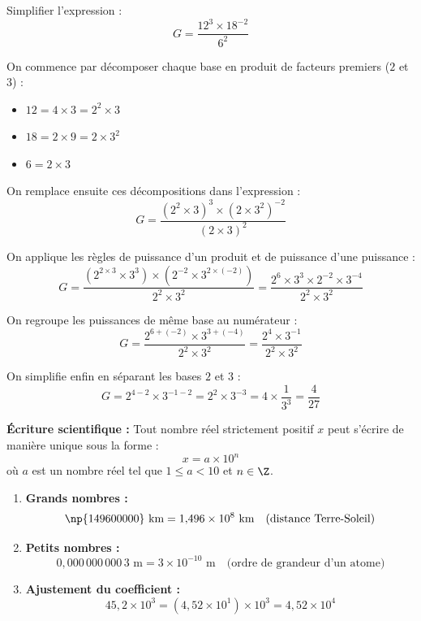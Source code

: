 \begin{ex}
	Simplifier l'expression :
	\[
		G = \frac{12^3 \times 18^{-2}}{6^2}
	\]

	On commence par décomposer chaque base en produit de facteurs premiers ($2$ et $3$) :
	\begin{itemize}
		\item $12 = 4 \times 3 = 2^2 \times 3$
		\item $18 = 2 \times 9 = 2 \times 3^2$
		\item $6 = 2 \times 3$
	\end{itemize}

	On remplace ensuite ces décompositions dans l'expression :
	\[
		G = \frac{\left( 2^2 \times 3 \right)^3 \times \left( 2 \times 3^2 \right)^{-2}}{\left( 2 \times 3 \right)^2}
	\]

	On applique les règles de puissance d'un produit et de puissance d'une puissance :
	\[
		G = \frac{\left( 2^{2 \times 3} \times 3^3 \right) \times \left( 2^{-2} \times 3^{2 \times (-2)} \right)}{2^2 \times 3^2} = \frac{2^6 \times 3^3 \times 2^{-2} \times 3^{-4}}{2^2 \times 3^2}
	\]

	On regroupe les puissances de même base au numérateur :
	\[
		G = \frac{2^{6+(-2)} \times 3^{3+(-4)}}{2^2 \times 3^2} = \frac{2^4 \times 3^{-1}}{2^2 \times 3^2}
	\]

	On simplifie enfin en séparant les bases $2$ et $3$ :
	\[
		G = 2^{4-2} \times 3^{-1-2} = 2^2 \times 3^{-3} = 4 \times \frac{1}{3^3} = \frac{4}{27}
	\]
\end{ex}

\newpage

\begin{df}
	\textbf{Écriture scientifique :} Tout nombre réel strictement positif $x$ peut s'écrire de manière unique sous la forme :
	\[
		x = a \times 10^n
	\]
	où $a$ est un nombre réel tel que $1 \leqslant a < 10$ et $n \in \Z$.
\end{df}

\begin{ex}
	\nline
	\begin{enumerate}
		\item \textbf{Grands nombres :}
		      \[
			      \np{149600000} \text{ km} = 1{,}496 \times 10^8 \text{ km} \quad \text{(distance Terre-Soleil)}
		      \]
		\item \textbf{Petits nombres :}
		      \[
			      0{,}000\,000\,000\,3 \text{ m} = 3 \times 10^{-10} \text{ m} \quad \text{(ordre de grandeur d'un atome)}
		      \]
		\item \textbf{Ajustement du coefficient :}
		      \[
			      45{,}2 \times 10^3 = (4{,}52 \times 10^1) \times 10^3 = 4{,}52 \times 10^4
		      \]
	\end{enumerate}
\end{ex}

